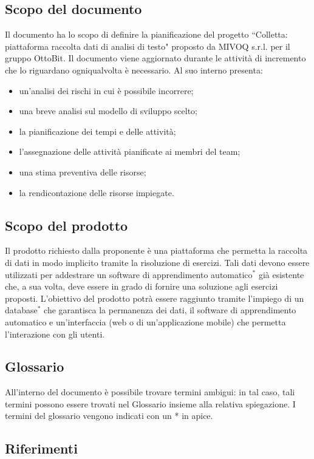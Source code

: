 \subsection{Scopo del documento}
	Il documento ha lo scopo di definire la pianificazione del progetto ``Colletta: piattaforma raccolta dati di analisi di testo" proposto da MIVOQ s.r.l. per il gruppo OttoBit. Il documento viene aggiornato durante le attività di incremento che lo riguardano ogniqualvolta è necessario. Al suo interno presenta:
	\begin{itemize}
		\item un'analisi dei rischi in cui è possibile incorrere;
		\item una breve analisi sul modello di sviluppo scelto;
		\item la pianificazione dei tempi e delle attività;
		\item l'assegnazione delle attività pianificate ai membri del team;
		\item una stima preventiva delle risorse;
		\item la rendicontazione delle risorse impiegate.
	\end{itemize}

\subsection{Scopo del prodotto}
	Il prodotto richiesto dalla proponente è una piattaforma che permetta la raccolta di dati in modo implicito tramite la risoluzione di esercizi. Tali dati devono essere utilizzati per addestrare un software di apprendimento automatico$^*$ già esistente che, a sua volta, deve essere in grado di fornire una soluzione agli esercizi proposti. L'obiettivo del prodotto potrà essere raggiunto tramite l'impiego di un database$^*$ che garantisca la permanenza dei dati, il software di apprendimento automatico e un'interfaccia (web o di un'applicazione mobile) che permetta l'interazione con gli utenti.

\subsection{Glossario}
	All'interno del documento è possibile trovare termini ambigui: in tal caso, tali termini possono essere trovati nel Glossario insieme alla relativa spiegazione. I termini del glossario vengono indicati con un * in apice.
	
\subsection{Riferimenti}
